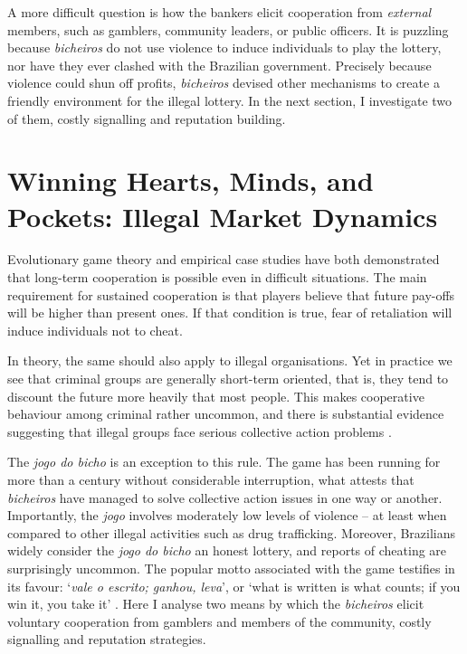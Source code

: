 \documentclass[a4paper,12pt]{article}
\begin{document}
A more difficult question is how the bankers elicit cooperation from \textit{external} members, such as gamblers, community leaders, or public officers. It is puzzling because \textit{bicheiros} do not use violence to induce individuals to play the lottery, nor have they ever clashed with the Brazilian government. Precisely because violence could shun off profits, \textit{bicheiros} devised other mechanisms to create a friendly environment for the illegal lottery. In the next section, I investigate two of them, costly signalling and reputation building. 

\section{Winning Hearts, Minds, and Pockets: Illegal Market Dynamics}%
\label{sub:pockets}

Evolutionary game theory \citep{axelrod1984evolution, axelrod1985achieving, smith1982evolution} and empirical case studies \citep{isaac1984divergent, ostrom1990governing} have both demonstrated that long-term cooperation is possible even in difficult situations. The main requirement for sustained cooperation is that players believe that future pay-offs will be higher than present ones. If that condition is true, fear of retaliation will induce individuals not to cheat. 

In theory, the same should also apply to illegal organisations. Yet in practice we see that criminal groups are generally short-term oriented, that is, they tend to discount the future more heavily that most people. This makes cooperative behaviour among criminal rather uncommon, and there is substantial evidence suggesting that illegal groups face serious collective action problems \citep[e.g.,][]{gambetta2009codes, leeson2010pirational, skarbek2011governance, skarbek2012prison, varese2001russian}. 

The \textit{jogo do bicho} is an exception to this rule. The game has been running for more than a century without considerable interruption, what attests that \textit{bicheiros} have managed to solve collective action issues in one way or another. Importantly, the \textit{jogo} involves moderately low levels of violence -- at least when compared to other illegal activities such as drug trafficking. Moreover, Brazilians widely consider the \textit{jogo do bicho} an honest lottery, and reports of cheating are surprisingly uncommon. The popular motto associated with the game testifies in its favour: `\textit{vale o escrito; ganhou, leva}', or `what is written is what counts; if you win it, you take it' \citep{magalhaes2005ganhou}. Here I analyse two means by which the \textit{bicheiros} elicit voluntary cooperation from gamblers and members of the community, costly signalling and reputation strategies. 
\end{document}
